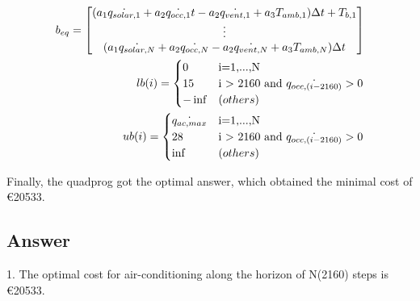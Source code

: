 \documentclass[titlepage,a4paper]{article}
\begin{document}
$$\begin{aligned}
\begin{array}{c@{\hspace{10pt}}c@{\hspace{10pt}}c}
        \end{array} \\ 
        b_{eq}=
        \begin{bmatrix}
            (a_1 \dot{q_{solar,1}}  + a_2 \dot{q_{occ,1}}  t -a_2 \dot{q_{vent,1}}+ a_3 T_{amb,1}) \Delta t +T_{b,1}\\ 
            \vdots \\ 
                (a_1 \dot{q_{solar,N}} + a_2 \dot{q_{occ,N}}  -a_2 \dot{q_{vent,N}} + a_3 T_{amb,N} )\Delta t                    
        \end{bmatrix} \\
        lb(i)=
        \begin{cases}
            0  & \text{i=1,...,N} \\
            15 & \text{i > 2160 and $ \dot{q_{occ,(i-2160)}} >0 $} \\
            -\inf & \text (others)
        \end{cases} \\
        ub(i)=
        \begin{cases}
            \dot{q_{ac,max}}  & \text{i=1,...,N} \\
            28 & \text{i > 2160 and $ \dot{q_{occ,(i-2160)}} >0 $} \\
            \inf & \text (others) \\
        \end{cases} 
    \end{aligned}
    $$


    Finally, the quadprog got the optimal answer, which obtained the minimal cost of \euro 20533.

    
    \subsection{Answer}

    1. The optimal cost for air-conditioning along the horizon of N(2160) steps is \euro 20533.



\ifx \allfiles \undefined    
\end{document}
